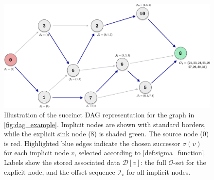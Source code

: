 \begin{figure}[htbp]

    \includegraphics[width=\textwidth]{assets/succinct-dag2.pdf}
    \caption{Illustration of the succinct DAG representation for the graph in \autoref{fig:dag_example}. Implicit nodes are shown with standard borders, while the explicit sink node (8) is shaded green. The source node (0) is red. Highlighted blue edges indicate the chosen successor $\sigma(v)$ for each implicit node $v$, selected according to \ref{def:sigma_function}. Labels show the stored associated data $\mathcal{D}[v]$: the full $\mathcal{O}$-set for the explicit node, and the offset sequence $\mathcal{I}_v$ for all implicit nodes.}
    \label{fig:succinct_dag_example}
\end{figure}

